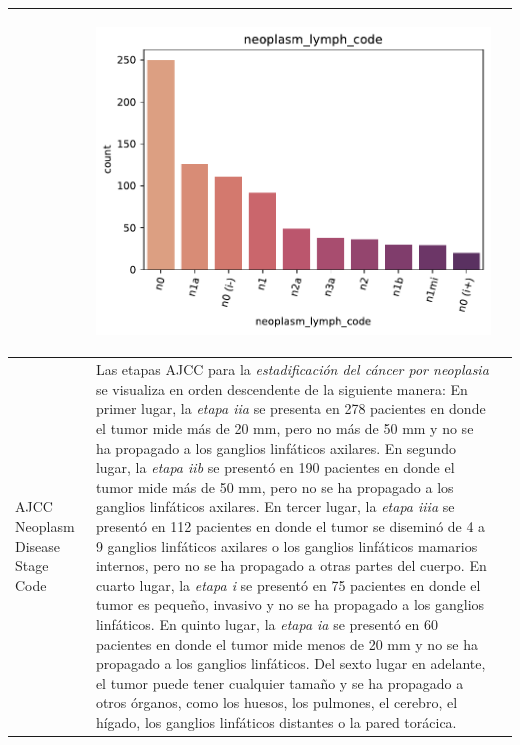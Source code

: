 \begin{table}[!htb]
\begin{threeparttable}
\begin{tabular}{p{2.5cm} p{7cm} p{6.5cm}}
			& \begin{center}\includegraphics[width=1\linewidth]{NOTEBOOK/IMAGENES_DESCRIPTIVAS/3_neoplasm_lymph_code}\end{center}
			\\ \hline
			AJCC Neoplasm Disease Stage Code
			& Las etapas AJCC para la \textit{estadificación del cáncer por neoplasia} se visualiza en orden descendente de la siguiente manera: En primer lugar, la \textit{etapa iia} se presenta en 278 pacientes en donde el tumor mide más de 20 mm, pero no más de 50 mm y no se ha propagado a los ganglios linfáticos axilares. En segundo lugar, la \textit{etapa iib} se presentó en 190 pacientes en donde el tumor mide más de 50 mm, pero no se ha propagado a los ganglios linfáticos axilares. En tercer lugar, la \textit{etapa iiia} se presentó en 112 pacientes en donde el tumor se diseminó de 4 a 9 ganglios linfáticos axilares o los ganglios linfáticos mamarios internos, pero no se ha propagado a otras partes del cuerpo. En cuarto lugar, la \textit{etapa i} se presentó en 75 pacientes en donde el tumor es pequeño, invasivo y no se ha propagado a los ganglios linfáticos. En quinto lugar, la \textit{etapa ia} se presentó en 60 pacientes en donde el tumor mide menos de 20 mm y no se ha propagado a los ganglios linfáticos. Del sexto lugar en adelante, el tumor puede tener cualquier tamaño y se ha propagado a otros órganos, como los huesos, los pulmones, el cerebro, el hígado, los ganglios linfáticos distantes o la pared torácica.
			

\end{tabular}
\end{threeparttable}
\end{table}

